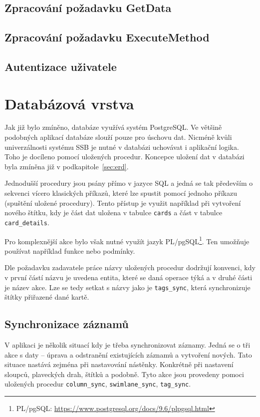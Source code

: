 \subsection{Zpracování požadavku GetData}
\blindtext


\subsection{Zpracování požadavku ExecuteMethod}
\blindtext


\subsection{Autentizace uživatele}
\blindtext



\section{Databázová vrstva}
Jak již bylo zmíněno, databáze využívá systém PostgreSQL. Ve většině podobných aplikací databáze slouží pouze pro úschovu dat. Nicméně kvůli univerzálnosti systému SSB je nutné v databázi uchovávat i aplikační logika. Toho je docíleno pomocí uložených procedur. Koncepce uložení dat v databázi byla zmíněna již v podkapitole~\ref{sec:erd}.

Jednodušší procedury jsou psány přímo v jazyce SQL a jedná se tak především o sekvenci vícero klasických příkazů, které lze spustit pomocí jednoho příkazu (spuštění uložené procedury). Tento přístup je využit například při vytvoření nového štítku, kdy je část dat uložena v tabulce \texttt{cards} a část v tabulce \texttt{card\_details}.

Pro komplexnější akce bylo však nutné využít jazyk PL/pgSQL\footnote{PL/pgSQL: \url{https://www.postgresql.org/docs/9.6/plpgsql.html}}. Ten umožňuje používat například funkce nebo podmínky.

Dle požadavku zadavatele práce názvy uložených procedur dodržují konvenci, kdy v první částí názvu je uvedena entita, které se daná operace týká a v druhé části je název akce. Lze se tedy setkat s názvy jako je \texttt{tags\_sync}, která synchronizuje štítky přiřazené dané kartě. 


\subsection{Synchronizace záznamů}
V aplikaci je několik situací kdy je třeba synchronizovat záznamy. Jedná se o tři akce s daty -- úprava a odstranění existujících záznamů a vytvoření nových. Tato situace nastává zejména při nastavování nástěnky. Konkrétně při nastavení sloupců, plaveckých drah, štítků a podobně. Tyto akce jsou provedeny pomoci uložených procedur \texttt{column\_sync}, \texttt{swimlane\_sync}, \texttt{tag\_sync}.

